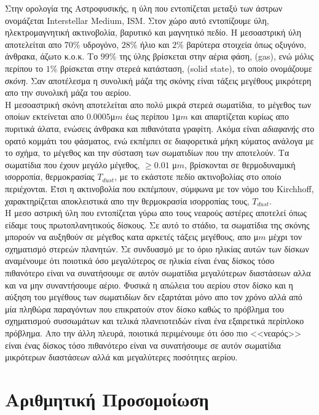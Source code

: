 Στην ορολογία της Αστροφυσικής, η ύλη που εντοπίζεται μεταξύ των άστρων ονομάζεται {\en Interstellar Medium, ISM}. Στον χώρο αυτό εντοπίζουμε ύλη, ηλεκτρομαγνητική ακτινοβολία, βαρυτικό και μαγνητικό πεδίο. Η μεσοαστρική ύλη αποτελείται απο $70\%$ υδρογόνο, $28\%$ ήλιο και $2\%$ βαρύτερα στοιχεία όπως οξυγόνο, άνθρακα, άζωτο κ.ο.κ. Το $99\%$ της ύλης βρίσκεται στην αέρια φάση, ({\en gas}), ενώ μόλις περίπου το $1\%$ βρίσκεται στην στερεά κατάσταση, ({\en solid state}), το οποίο ονομάζουμε {\it σκόνη}. Σαν αποτέλεσμα η συνολική μάζα της σκόνης είναι τάξεις μεγέθους μικρότερη απο την συνολική μάζα του αερίου.\\
Η μεσοαστρική σκόνη αποτελείται απο πολύ μικρά στερεά σωματίδια, το μέγεθος των οποίων εκτείνεται απο $0.0005$μ$m$ έως περίπου $1$μ$m$ \cite[{\en Chap.~1, Sect.~2.5}]{tielens2005physics} και απαρτίζεται κυρίως απο πυριτικά άλατα, ενώσεις άνθρακα και πιθανότατα γραφίτη. Ακόμα είναι {\it αδιαφανής} στο ορατό κομμάτι του φάσματος, ενώ εκπέμπει σε διαφορετικά μήκη κύματος ανάλογα με το σχήμα, το μέγεθος και την σύσταση των σωματιδίων που την αποτελούν.
Τα σωματίδια που έχουν μεγάλο μέγεθος, $\geq 0.01$ μ$m$, βρίσκονται σε θερμοδυναμική ισορροπία, θερμοκρασίας $T_{dust}$, με το εκάστοτε πεδίο ακτινοβολίας στο οποίο περιέχονται. Έτσι η ακτινοβολία που εκπέμπουν, σύμφωνα με τον νόμο του {\en Kirchhoff}, χαρακτηρίζεται αποκλειστικά απο την θερμοκρασία ισορροπίας τους, $T_{dust}$.\\

Η μεσο αστρική ύλη που εντοπίζεται γύρω απο τους νεαρούς αστέρες αποτελεί όπως είδαμε τους πρωτοπλανητικούς δίσκους. Σε αυτό το στάδιο, τα σωματίδια της σκόνης μπορούν να αυξηθούν σε μέγεθος κατα αρκετές τάξεις μεγέθους, απο μ$m$ μέχρι τον σχηματισμό στερεών πλανητών. Σε συνδυασμό με το όριο ηλικίας αυτών των δίσκων αναμένουμε ότι ποιοτικά όσο μεγαλύτερος σε ηλικία είναι ένας δίσκος τόσο πιθανότερο είναι να συνατήσουμε σε αυτόν σωματίδια μεγαλύτερων διαστάσεων αλλα και να μην συναντήσουμε αέριο. Φυσικά η απώλεια του αερίου στον δίσκο και η αύξηση του μεγέθους των σωματιδίων δεν εξαρτάται μόνο απο τον χρόνο αλλά από μία πληθώρα παραγόντων που επικρατούν στον δίσκο καθώς το πρόβλημα του σχηματισμού συσσωμάτων και τελικά πλανειοτειδών είναι ένα εξαιρετικά περίπλοκο πρόβλημα. Απο την άλλη πλευρά, ποιοτικά περιμένουμε ότι όσο πιο <<νεαρός>> είναι ένας δίσκος τόσο πιθανότερο είναι να συνατήσουμε σε αυτόν σωματίδια μικρότερων διαστάσεων αλλά και μεγαλύτερες ποσότητες αερίου. 
 

\section{Αριθμητική Προσομοίωση}
\en
